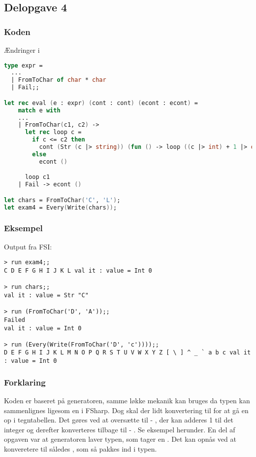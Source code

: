 \subsection{Delopgave 4}\label{ass:1-4}
\subsubsection{Koden}
Ændringer i 
\begin{lstlisting}[language=fsharp]
type expr = 
  ...
  | FromToChar of char * char
  | Fail;;

let rec eval (e : expr) (cont : cont) (econt : econt) = 
    match e with
    ...
    | FromToChar(c1, c2) ->
      let rec loop c =
        if c <= c2 then
          cont (Str (c |> string)) (fun () -> loop ((c |> int) + 1 |> char))
        else
          econt ()

      loop c1
    | Fail -> econt ()

let chars = FromToChar('C', 'L');
let exam4 = Every(Write(chars));
\end{lstlisting}

\subsubsection{Eksempel}
Output fra FSI:
\begin{lstlisting}
> run exam4;;
C D E F G H I J K L val it : value = Int 0

> run chars;;
val it : value = Str "C"

> run (FromToChar('D', 'A'));;
Failed
val it : value = Int 0

> run (Every(Write(FromToChar('D', 'c'))));;
D E F G H I J K L M N O P Q R S T U V W X Y Z [ \ ] ^ _ ` a b c val it : value = Int 0
\end{lstlisting}

\subsubsection{Forklaring}
Koden er baseret på  generatoren, samme løkke mekanik kan bruges da  typen kan sammenlignes ligesom en  i FSharp. Dog skal der lidt konvertering til for at gå en op i tegntabellen. Det gøres ved at oversætte  til  - , der kan adderes 1 til det integer og derefter konverteres tilbage til  - . Se eksempel herunder. En del af opgaven var at generatoren laver  typen, som tager en . Det kan opnås ved at konveretere  til  således , som så pakkes ind i  typen.

